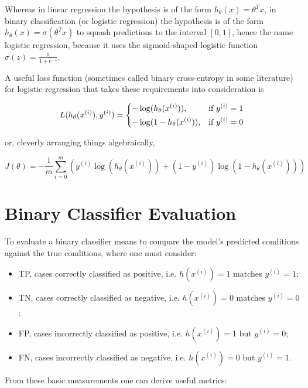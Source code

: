 Whereas in linear regression the hypothesis is of the form $h_{\theta}(x) = \theta^Tx$, in binary classification (or logistic regression) the hypothesis is of the form $h_{\theta}(x) = \sigma(\theta^Tx)$ to squash predictions to the interval $[0, 1]$, hence the name logistic regression, because it uses the sigmoid-shaped logistic function $\sigma(z) = \frac{1}{1 + e^{-z}}$.

A useful loss function (sometimes called binary cross-entropy in some literature) for logistic regression that takes these requirements into consideration is

$$
L(h_{\theta}(x^{(i)}), y^{(i)}) =
\begin{dcases}
    -\log(h_{\theta}(x^{(i)})),& \text{if } y^{(i)} = 1\\
    -\log(1 - h_{\theta}(x^{(i)})),& \text{if } y^{(i)} = 0
\end{dcases}
$$

or, cleverly arranging things algebraically,

$$
J(\theta) = -\frac{1}{m} \sum_{i=0}^{m} ( y^{(i)}\log(h_{\theta}(x^{(i)})) + (1 - y^{(i)})\log(1 - h_{\theta}(x^{(i)})) )
$$

\section{Binary Classifier Evaluation}

To evaluate a binary classifier means to compare the model's predicted conditions against the true conditions, where one must consider:

\begin{itemize}
    \item \ac{TP}, cases correctly classified as positive, i.e. $h(x^{(i)}) = 1$ matches $y^{(i)} = 1$;
    \item \ac{TN}, cases correctly classified as negative, i.e. $h(x^{(i)}) = 0$ matches $y^{(i)} = 0$;
    \item \ac{FP}, cases incorrectly classified as positive, i.e. $h(x^{(i)}) = 1$ but $y^{(i)} = 0$;
    \item \ac{FN}, cases incorrectly classified as negative, i.e. $h(x^{(i)}) = 0$ but $y^{(i)} = 1$.
\end{itemize}

From these basic measurements one can derive useful metrics:


